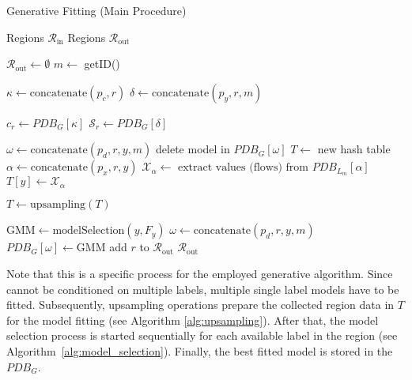 \documentclass[../../main.tex]{subfiles}
\begin{document}
\begin{algorithm}
    \caption{Generative Fitting (Main Procedure)}
    \label{alg:generative_fitting}
 
    \begin{algorithmic}[1]
        \REQUIRE Regions $\mathcal{R}_{\text{in}}$
        \ENSURE Regions $\mathcal{R}_{\text{out}}$

        \STATE $\mathcal{R}_{\text{out}} \leftarrow \emptyset$
        \STATE $m \leftarrow$ getID()

            \STATE $\kappa \leftarrow \text{concatenate}(p_c, r)$
            \STATE $\delta \leftarrow \text{concatenate}(p_y, r, m)$

            \STATE $c_r \leftarrow PDB_G[\kappa]$
            \STATE $\mathcal{S}_r \leftarrow PDB_G[\delta]$ 

                    \STATE $\omega \leftarrow \text{concatenate}(p_d, r, y, m)$ 
                    \STATE delete model in $PDB_G[\omega]$
                \ENDFOR
            \ELSE
                \STATE $T \leftarrow$ new hash table
                    \STATE $\alpha \leftarrow \text{concatenate}(p_x, r, y)$
                    \STATE $\mathcal{X}_\alpha \leftarrow \text{ extract values (flows) from } PDB_{L_m}[\alpha]$
                    \STATE $T[y] \leftarrow \mathcal{X}_\alpha$
                \ENDFOR

                \STATE $T \leftarrow \text{upsampling}(T)$

                    \STATE $\text{GMM} \leftarrow \text{modelSelection}(y, F_y)$
                    \STATE $\omega \leftarrow \text{concatenate}(p_d, r, y, m)$ 
                    \STATE $PDB_G[\omega] \leftarrow \text{GMM}$
                \ENDFOR
                \STATE add $r$ to $\mathcal{R}_{\text{out}}$
            \ENDIF
        \ENDFOR
        \RETURN $\mathcal{R}_{\text{out}}$
    \end{algorithmic}
 \end{algorithm}

 
 Note that this is a specific process for the employed generative algorithm. Since  cannot be conditioned on multiple labels, multiple single label models have to be fitted. Subsequently, upsampling operations prepare the collected region data in $T$ for the model fitting (see Algorithm \ref{alg:upsampling}). After that, the model selection process is started sequentially for each available label in the region (see Algorithm~\ref{alg:model_selection}). Finally, the best fitted model is stored in the $PDB_G$. 
\end{document}
